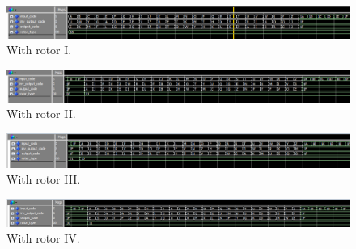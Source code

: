 \documentclass[10pt]{article}
\begin{document}
\begin{figure}[!htb]
    \centering
    \includegraphics[width=1\textwidth]{./perm_2.png}
    \caption{With rotor I.}
    \label{fig:perm_2}
\end{figure}
\begin{figure}[!htb]
    \centering
    \includegraphics[width=1\textwidth]{./perm_3.png}
    \caption{With rotor II.}
    \label{fig:perm_3}
\end{figure}
\begin{figure}[!htb]
    \centering
    \includegraphics[width=1\textwidth]{./perm_4.png}
    \caption{With rotor III.}
    \label{fig:perm_4}
\end{figure}
\begin{figure}[!htb]
    \centering
    \includegraphics[width=1\textwidth]{./perm_5.png}
    \caption{With rotor IV.}
    \label{fig:perm_5}
\end{figure}
\end{document}
